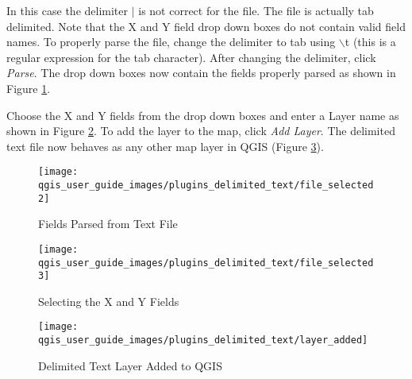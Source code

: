 In this case the delimiter \mbox{$|$} is not correct for the file. The file is actually tab delimited. Note that the X and Y field drop down boxes do not contain valid field names.
To properly parse the file, change the delimiter to tab using
\mbox{$\backslash$}t (this is a regular expression for the tab character). After
changing the delimiter, click {\em Parse}.
The drop down boxes now contain the fields properly parsed as shown in Figure
\ref{fig:delim_text_file_selected2}.

Choose the X and Y fields from the drop down boxes and enter a Layer name as
shown in Figure \ref{fig:delim_text_file_selected3}. To add the layer to the
map, click {\em Add Layer}. The delimited text file now behaves as any other map
layer in QGIS (Figure \ref{fig:layer_added}).
\begin{figure}[h]
   \begin{center}
   \caption{Fields Parsed from Text File}\label{fig:delim_text_file_selected2}\smallskip
   \texttt{[image: qgis\_user\_guide\_images/plugins\_delimited\_text/file\_selected2]}
   \end{center}  
\end{figure}

\begin{figure}[h]
   \begin{center}
   \caption{Selecting the X and Y Fields}\label{fig:delim_text_file_selected3}\smallskip
   \texttt{[image: qgis\_user\_guide\_images/plugins\_delimited\_text/file\_selected3]}
   \end{center}  
\end{figure}
\begin{figure}[h]
   \begin{center}
   \caption{Delimited Text Layer Added to QGIS}\label{fig:layer_added}\smallskip
\texttt{[image: qgis\_user\_guide\_images/plugins\_delimited\_text/layer\_added]}
   \end{center}  
\end{figure}



